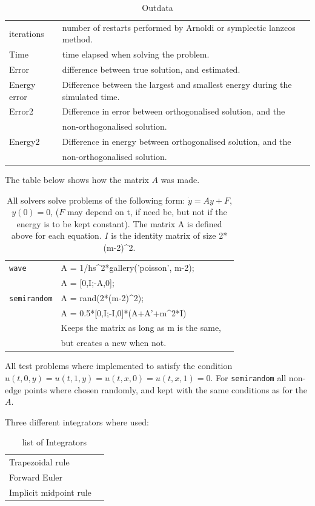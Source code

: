 \begin{table}[h]
\centering
\begin{tabular}{l|l}
 iterations& number of restarts performed by Arnoldi or symplectic lanzcos method.  \\
 Time& time elapsed when solving the problem. \\
 Error& difference between true solution, and estimated. \\
 Energy error& Difference between the largest and smallest energy during the simulated time. \\
 Error2& Difference in error between orthogonalised solution, and the\\& non-orthogonalised solution. \\
 Energy2&Difference in energy between orthogonalised solution, and the\\& non-orthogonalised solution. \\
\end{tabular}
\caption{Outdata}
\label{tab:outdata}
\end{table}
The table below shows how the matrix $A$ was made.
\begin{table}[h]
\centering
\begin{tabular}{l l l}
 \texttt{wave} & A = 1/hs\^{}2*gallery('poisson', m-2); \\&
    A = [0,I;-A,0]; \\
    \hline
 \texttt{semirandom} & A = rand(2*(m-2)\^{}2); \\ &
            A = 0.5*[0,I;-I,0]*(A+A'+m\^{}2*I)\\
            & Keeps the matrix as long as m is the same, \\ & but creates a new when not.
\end{tabular}
\caption{ All solvers solve problems of the following form: $\dot{y} = Ay + F$, $y(0) = 0$, ($F$ may depend on t, if need be, but not if the energy is to be kept constant). The matrix A is defined above for each equation. $I$ is the identity matrix of size 2*(m-2)\^{}2.  }
\label{tab:implemented}
\end{table}
All test problems where implemented to satisfy the condition $u(t,0,y) = u(t,1,y) = u(t,x,0) = u(t,x,1) = 0$. For \texttt{semirandom} all non-edge points where chosen randomly, and kept with the same conditions as for the $A$.

Three different integrators where used:
\begin{table}[h]
\centering
\begin{tabular}{l|c}
 Trapezoidal rule &  \\
 Forward Euler & \\
 Implicit midpoint rule  & \\
\end{tabular}
\caption{list of Integrators}
\label{tab:integrators}
\end{table}

